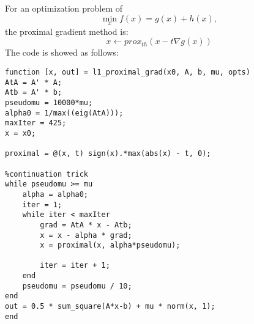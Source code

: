 \documentclass[11pt, oneside]{article}   	%
\begin{document}
For an optimization problem of 
\begin{equation}
  \min_{x} f(x)=g(x)+h(x),
\end{equation}
the proximal gradient method is:
\begin{equation}
  x\gets prox_{t h}(x-t\nabla g(x))
\end{equation}
The code is showed as follows:
\lstset{
 frame=single, 
breaklines=true,
language=MATLAB,
 }
\begin{lstlisting}
function [x, out] = l1_proximal_grad(x0, A, b, mu, opts)
AtA = A' * A;
Atb = A' * b;
pseudomu = 10000*mu;
alpha0 = 1/max((eig(AtA)));
maxIter = 425;
x = x0;

proximal = @(x, t) sign(x).*max(abs(x) - t, 0);

%continuation trick
while pseudomu >= mu
    alpha = alpha0;
    iter = 1;
    while iter < maxIter
        grad = AtA * x - Atb;
        x = x - alpha * grad;
        x = proximal(x, alpha*pseudomu);
               
        iter = iter + 1;
    end
    pseudomu = pseudomu / 10;
end
out = 0.5 * sum_square(A*x-b) + mu * norm(x, 1);
end
\end{lstlisting}
\end{document}
